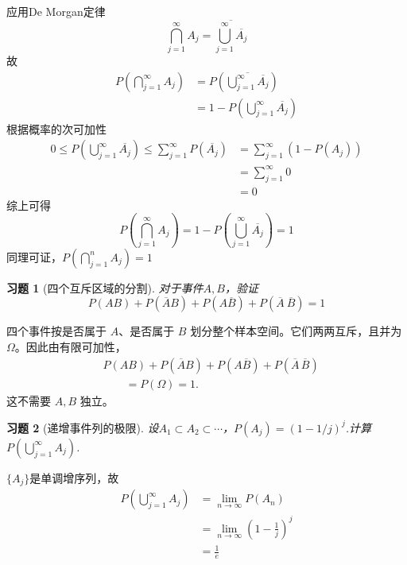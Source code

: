 \documentclass[12pt,fontset=fandol]{ctexart}
\newtheorem{exercise}{习题}[section]
\begin{document}
\begin{solve}\label{a:Y1.18}
应用De Morgan定律
\[\bigcap\limits_{j = 1}^\infty  {{A_j}}  = \overline {\bigcup\limits_{j = 1}^\infty  {\overline {{A_j}} } } \]
故
\[\begin{aligned}P(\bigcap\limits_{j = 1}^\infty  {{A_j}} ) &= P(\overline {\bigcup\limits_{j = 1}^\infty  {\overline {{A_j}} } } ) \\&= 1 - P(\bigcup\limits_{j = 1}^\infty  {\overline {{A_j}} } )\end{aligned}\]
根据概率的次可加性
\[\begin{aligned}0 \leqslant P(\bigcup\limits_{j = 1}^\infty  {\overline {{A_j}} } ) \leqslant \sum\limits_{j = 1}^\infty  {P(\overline {{A_j}} )}  &= \sum\limits_{j = 1}^\infty  {(1 - P({A_j}))}  \\&= \sum\limits_{j = 1}^\infty  0\\&=0 \end{aligned}\]
综上可得
\[P(\bigcap\limits_{j = 1}^\infty  {{A_j}} ) = 1 - P(\bigcup\limits_{j = 1}^\infty  {\overline {{A_j}} } ) = 1\]
同理可证，$P(\bigcap\limits_{j = 1}^n {{A_j}} ) = 1$
\end{solve}

\begin{exercise}[四个互斥区域的分割]\label{q:Y1.19}
对于事件$A,B$，验证
\[
P(AB)+P(\overline{A}B)+P(A\overline{B})+P(\overline{A}\:\overline{B})=1
\]\par{}
\end{exercise}

\begin{solve}\label{a:Y1.19}四个事件按是否属于 $A$、是否属于 $B$ 划分整个样本空间。它们两两互斥，且并为 $\Omega$。因此由有限可加性，\[\begin{aligned}&P(AB)+P(\overline AB)+P(A\overline B)+P(\overline A\,\overline B)\\&\qquad=P(\Omega)=1.\end{aligned}\]这不需要 $A,B$ 独立。\end{solve}

\begin{exercise}[递增事件列的极限]\label{q:Y1.20}
设$A_1\subset A_2\subset \cdots$，$P(A_j)=(1-1/j)^j$.计算$P(\bigcup\limits_{j = 1}^\infty  {{A_j}} )$.\par{}
\end{exercise}

\begin{solve}\label{a:Y1.20}
$\{A_j\}$是单调增序列，故
\[\begin{aligned}
P(\bigcup\limits_{j = 1}^\infty  {{A_j}} ) &= \mathop {\lim }\limits_{n \to \infty } P({A_n}) \\&= \mathop {\lim }\limits_{n \to \infty } {(1 - \frac{1}{j})^j} \\&= \frac{1}{e}
\end{aligned}\]
\end{solve}
\end{document}
